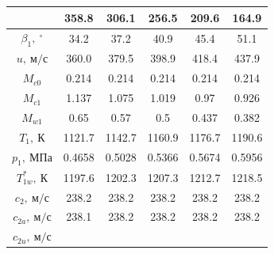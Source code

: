 \documentclass[a4paper,12pt]{article}
\begin{document}
\begin{longtable}{
    |
%    
    c|
%    
    c|
%    
    c|
%    
    c|
%    
    c|
%    
    c|
%    
    }
%        
        & 358.8
%        
        & 306.1
%        
        & 256.5
%        
        & 209.6
%        
        & 164.9
%        
        \\
        \hline
%        
        $\beta_1,\ ^\circ$
%        
        & 34.2
%        
        & 37.2
%        
        & 40.9
%        
        & 45.4
%        
        & 51.1
%        
        \\
        \hline
%        
        $u,\ м/с$
%        
        & 360.0
%        
        & 379.5
%        
        & 398.9
%        
        & 418.4
%        
        & 437.9
%        
        \\
        \hline
%        
        $M_{c0}$
%        
        & 0.214
%        
        & 0.214
%        
        & 0.214
%        
        & 0.214
%        
        & 0.214
%        
        \\
        \hline
%        
        $M_{c1}$
%        
        & 1.137
%        
        & 1.075
%        
        & 1.019
%        
        & 0.97
%        
        & 0.926
%        
        \\
        \hline
%        
        $M_{w1}$
%        
        & 0.65
%        
        & 0.57
%        
        & 0.5
%        
        & 0.437
%        
        & 0.382
%        
        \\
        \hline
%        
        $T_1,\ К$
%        
        & 1121.7
%        
        & 1142.7
%        
        & 1160.9
%        
        & 1176.7
%        
        & 1190.6
%        
        \\
        \hline
%        
        $p_1,\ МПа$
%        
        & 0.4658
%        
        & 0.5028
%        
        & 0.5366
%        
        & 0.5674
%        
        & 0.5956
%        
        \\
        \hline
%        
        $T_{1w}^*,\ К$
%        
        & 1197.6
%        
        & 1202.3
%        
        & 1207.3
%        
        & 1212.7
%        
        & 1218.5
%        
        \\
        \hline
%        
        $c_2,\ м/с$
%        
        & 238.2
%        
        & 238.2
%        
        & 238.2
%        
        & 238.2
%        
        & 238.2
%        
        \\
        \hline
%        
        $c_{2a},\ м/с$
%        
        & 238.1
%        
        & 238.2
%        
        & 238.2
%        
        & 238.2
%        
        & 238.2
%        
        \\
        \hline
%        
        $c_{2u},\ м/с$

\end{longtable}
\end{document}
